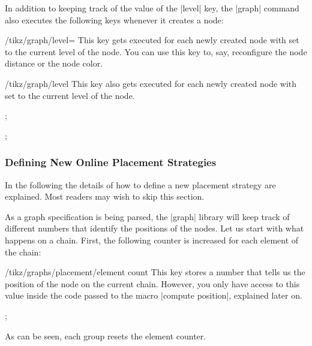 In addition to keeping track of the value of the |level| key, the
|graph| command also executes the following keys whenever it creates a
node:

\begin{stylekey}{/tikz/graph/level=}
  This key gets executed for each newly created node with 
  set to the current level of the node. You can use this key to, say,
  reconfigure the node distance or the node color.
\end{stylekey}

\begin{stylekey}{/tikz/graph/level }
  This key also gets executed for each newly created node with
   set to the current level of the node.
\begin{codeexample}[]
\tikz {};
\end{codeexample}
\begin{codeexample}[]
\tikz {};
\end{codeexample}
\end{stylekey}



\subsubsection{Defining New Online Placement Strategies}

\label{section-library-graphs-new-online}

In the following the details of how to define a new placement strategy
are explained. Most readers may wish to skip this section.

As a graph specification is being parsed, the |graph| library will keep
track of different numbers that identify the positions of the
nodes. Let us start with what happens on a chain. First, the following 
counter is increased for each element of the chain:
\begin{key}{/tikz/graphs/placement/element count}
  This key stores a number that tells us the position of the node on
  the current chain. However, you only have access to this value
  inside the code passed to the macro |compute position|, explained
  later on.
\begin{codeexample}[]
\tikz {};
\end{codeexample}
  As can be seen, each group resets the element counter.
\end{key}

